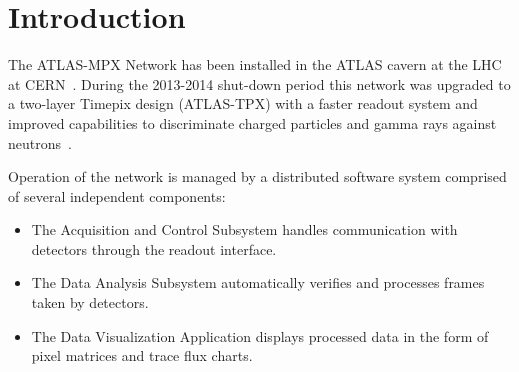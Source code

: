 

\section{\label{sec:introduction}Introduction}
The ATLAS-MPX Network has been installed in the ATLAS cavern at the LHC at CERN~\cite{CampbellATLAS}. During the 2013-2014 shut-down period this network was upgraded to a two-layer Timepix design (ATLAS-TPX) with a faster readout system and improved capabilities to discriminate charged particles and gamma rays against neutrons~\cite{Proposal_Claude,Bergmann_ATLASTPX_2016}.

Operation of the network is managed by a distributed software system comprised of several independent components:
~
\begin{itemize}
  \item The Acquisition and Control Subsystem handles communication with detectors through the readout interface.
  \item The Data Analysis Subsystem automatically verifies and processes frames taken by detectors.
  \item The Data Visualization Application displays processed data in the form of pixel matrices and trace flux charts.
\end{itemize}